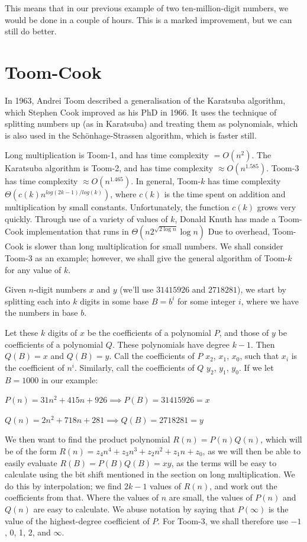 \documentclass{article}
\begin{document}
This means that in our previous example of two ten-million-digit numbers, we would be done in a couple of hours. This is a marked improvement, but we can still do better.

\section{Toom-Cook}

In 1963, Andrei Toom described a generalisation of the Karatsuba algorithm, which Stephen Cook improved as his PhD in 1966. It uses the technique of splitting numbers up (as in Karatsuba) and treating them as polynomials, which is also used in the Sch\"onhage-Strassen algorithm, which is faster still.

Long multiplication is Toom-1, and has time complexity \(=O(n^2)\). The Karatsuba algorithm is Toom-2, and has time complexity \(\approx{}O(n^1.585)\). Toom-3 has time complexity \(\approx{}O(n^1.465)\). In general, Toom-\(k\) has time complexity \(\Theta(c(k)n^{log(2k-1)/log(k)})\), where \(c(k)\) is the time spent on addition and multiplication by small constants. Unfortunately, the function \(c(k)\) grows very quickly. Through use of a variety of values of \(k\), Donald Knuth has made a Toom-Cook implementation that runs in \(\Theta(n2^{\sqrt{2\log{}n}}\log{}n)\) Due to overhead, Toom-Cook is slower than long multiplication for small numbers. We shall consider Toom-3 as an example; however, we shall give the general algorithm of Toom-\(k\) for any value of \(k\).

Given \(n\)-digit numbers \(x\) and \(y\) (we'll use \(31415926\) and \(2718281\)), we start by splitting each into \(k\) digits in some base \(B=b^i\) for some integer \(i\), where we have the numbers in base \(b\).

Let these \(k\) digits of \(x\) be the coefficients of a polynomial \(P\), and those of \(y\) be coefficients of a polynomial \(Q\). These polynomials have degree \(k-1\). Then \(Q(B)=x\) and \(Q(B)=y\). Call the coefficients of \(P\) \(x_2\), \(x_1\), \(x_0\), such that \(x_i\) is the coefficient of \(n^i\). Similarly, call the coefficients of \(Q\) \(y_2\), \(y_1\), \(y_0\). If we let \(B=1000\) in our example:

{\(P(n)=31n^2+415n+926 \implies P(B)=31415926=x\)}

\(Q(n)=2n^2+718n+281 \implies Q(B)=2718281=y\)

We then want to find the product polynomial \(R(n)=P(n)Q(n)\), which will be of the form \(R(n)=z_4n^4+z_3n^3+z_2n^2+z_1n+z_0\), as we will then be able to easily evaluate \(R(B)=P(B)Q(B)=xy\), as the terms will be easy to calculate using the bit shift mentioned in the section on long multiplication. We do this by interpolation; we find \(2k-1\) values of \(R(n)\), and work out the coefficients from that. Where the values of \(n\) are small, the values of \(P(n)\) and \(Q(n)\) are easy to calculate. We abuse notation by saying that \(P(\infty)\) is the value of the highest-degree coefficient of \(P\). For Toom-3, we shall therefore use \(-1\), 0, 1, 2, and \(\infty\).
\end{document}
